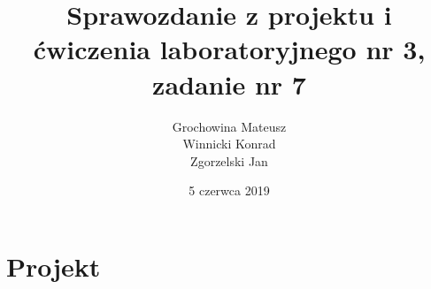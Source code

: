 \documentclass[a4paper,titlepage,11pt,twosides,floatssmall]{mwrep}
\begin{document}
\frenchspacing
\pagestyle{uheadings}

\title{\bf Sprawozdanie z projektu i ćwiczenia laboratoryjnego nr 3, zadanie nr 7\vskip 0.1cm}
\author{Grochowina Mateusz\\Winnicki Konrad\\Zgorzelski Jan}
\date{5 czerwca 2019}

\makeatletter
\renewcommand{\maketitle}{\begin{titlepage}
\begin{center}
{\LARGE {\bf Politechnika Warszawska}}\\
\vspace{0.4cm}
{\LARGE {\bf Wydział Elektroniki i Technik Informacyjnych}}\\
\vspace{0.2cm}
{\LARGE {\bf Instytut Automatyki i Informatyki Stosowanej}}\\
\end{center}
\vspace{5cm}
\begin{center}
{\bf \LARGE Projektowanie ukladów sterowania\\ (projekt grupowy) \vskip 0.1cm}
\end{center}
\vspace{1cm}
\begin{center}
{\bf \LARGE \@title}
\end{center}
\vspace{7cm}
{\bf Autorzy:\\ \Large \@author \par}
\vspace*{\stretch{6}}
\begin{center}
\bf{\large{Warszawa, \@date\vskip 0.1cm}}
\end{center}
\end{titlepage}
}
\makeatother


\tableofcontents
\chapter{Projekt}
\lstset{style=custommatlab}






\end{document}
